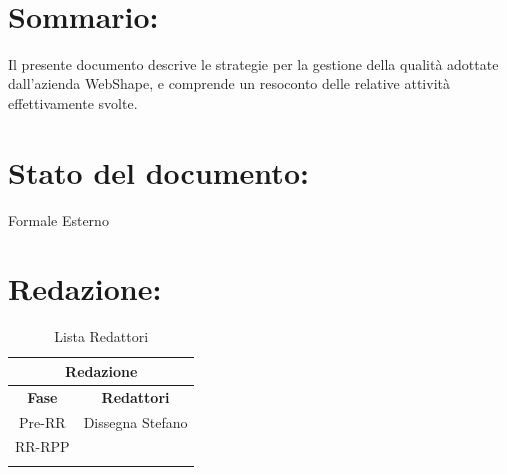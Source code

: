 \newpage

\begin{center} %
	\begin{Huge}	
				\textbf{\TITOLODOC}
			\\
	\end{Huge}
\end{center}

\section*{\LARGE Sommario:} %
\indent \indent
Il presente documento descrive le strategie per la gestione della qualit\`a adottate dall'azienda WebShape, e comprende un resoconto delle relative attivit\`a effettivamente svolte.

\section*{\LARGE Stato del documento:}
\indent \indent
	Formale Esterno

\section*{\LARGE Redazione:}
	\begin{table}[!h]
		\begin{center}
			\begin{tabular}
				{|c|c|}
				\hline
				\multicolumn{2}{|c|}{ \textbf{Redazione} } \\
				\hline
				\textbf{Fase} & \textbf{Redattori} \\
				\hline
				Pre-RR & Dissegna Stefano\\
				\hline
				RR-RPP & \\
										& \\
				\hline
			\end{tabular}
			\caption{Lista Redattori} %
			\label{tabredazione}
		\end{center}
	\end{table}	

